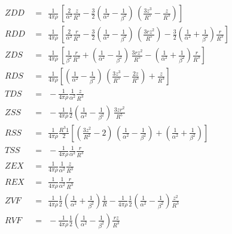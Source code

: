 \documentclass{article}
\begin{document}
\begin{equation*}
\begin{aligned}
ZDD \,&=   \ \   \frac{1}{  4 \pi \rho } \, \left[ { \frac{2}{ \alpha^2 }\frac{z}{  R^3 } - \frac{3}{ 2 }\left( \frac{1}{ \alpha^2 }- \frac{1}{ \beta^2 }\right) \, \left( \frac{ 3 z^3  }{  R^5 } - \frac{ z  }{  R^3 } \right) } \right] \\
RDD \,&=   \ \   \frac{1}{  4 \pi \rho } \, \left[ { \frac{2}{ \alpha^2 }\frac{r}{  R^3 } - \frac{3}{ 2 }\left( \frac{1}{ \alpha^2 }- \frac{1}{ \beta^2 }\right) \, \left( \frac{ 3 r z^2  }{  R^5 } \right) - \frac{3}{ 2 }\left( \frac{1}{ \alpha^2 }+ \frac{1}{ \beta^2 }\right) \frac{r}{ R^3 }} \right] \\
ZDS \,&=   \ \   \frac{1}{  4 \pi \rho } 
 \, \left[ { \frac{1}{ \beta^2 }\frac{r}{  R^3 } + \left( \frac{1}{ \alpha^2 }- \frac{1}{ \beta^2 }\right) \,  \frac{ 3 r z^2  }{  R^5 }  -  \left( \frac{1}{ \alpha^2 }+ \frac{1}{ \beta^2 }\right) \frac{r}{ R^3 }} \right] \\
RDS \,&=  \ \   \frac{1}{  4 \pi \rho }
\left[ {
  \left( \frac{1}{ \alpha^2 }- \frac{1}{ \beta^2 }\right) \, \left( \frac{ 3 z^3  }{  R^5 } - \frac{ 2 z  }{  R^3 } \right) + \frac{ z  }{  R^3 } 
} \right] \\
TDS \,&= \ \   - \frac{1}{  4 \pi \rho } \frac{1}{ \alpha^2 }\frac{ z  }{  R^3 } \\
ZSS \,&=  \ \   - \frac{1}{  4 \pi \rho } \frac{1}{ 2 }\left( \frac{1}{ \alpha^2 }- \frac{1}{ \beta^2 }\right) \, \frac{ 3 z r^2  }{  R^5 } \\
RSS \,&=  \ \   \frac{1}{  4 \pi \rho } \frac{ R^3 {}1}{ 2 }\left[ {
\left( \frac{ 3 z^2  }{  R^2 } - 2 \right) \, \left( \frac{1}{ \alpha^2 }- \frac{1}{ \beta^2 }\right) + \left( \frac{1}{ \alpha^2 }+ \frac{1}{ \beta^2 }\right)
} \right] \\
TSS \,&=  \ \    - \frac{1}{  4 \pi \rho } \frac{1}{ \alpha^2 }\frac{r}{ R^3 } \\
ZEX \,&=  \ \   \frac{1}{  4 \pi \rho } \frac{1}{ \alpha^2 }\frac{z}{ R^3 } \\
REX \,&=  \ \   \frac{1}{  4 \pi \rho } \frac{1}{ \alpha^2 }\frac{r}{ R^3 } \\
ZVF \,&=  \ \   \frac{1}{  4 \pi \rho } \frac{1}{ 2 }\left( \frac{1}{ \alpha^2 }+ \frac{1}{ \beta^2 }\right) \frac{1}{ R }- \frac{1}{  4 \pi \rho } \frac{1}{ 2 }\left(  \frac{1}{ \alpha^2 }- \frac{1}{ \beta^2 }\right) \frac{z^2}{ R^3 } \\
RVF \,&=  \ \   - \frac{1}{  4 \pi \rho } \frac{1}{ 2 }\left( \frac{1}{ \alpha^2 }- \frac{1}{ \beta^2 }\right) \frac{rz}{ R^3 } \\

\end{aligned}
\end{equation*}
\end{document}
